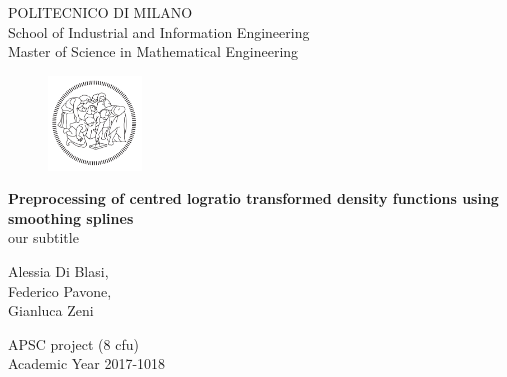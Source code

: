 \thispagestyle{empty}

\vspace*{-1.5cm} \bfseries{
\begin{center}
  \large
  POLITECNICO DI MILANO\\
  \normalsize
  School of Industrial and Information Engineering\\
  Master of Science in Mathematical Engineering\\
  \begin{figure}[htbp]
    \begin{center}
      \includegraphics[width=2.5cm]{./pictures/logopoli.png}
    \end{center}
  \end{figure}
  \vspace*{1.5cm} \LARGE



  \textbf{Preprocessing of centred logratio transformed density functions using smoothing splines}\\



  \vspace*{.75truecm} \Large
  our subtitle \\
  
  \vspace*{3.75truecm} \large
  
    Alessia Di Blasi,\\
    Federico Pavone,\\
    Gianluca Zeni
  
  
  \vspace*{2.75cm} \large

  APSC project (8 cfu) \\

  \vspace*{1.0truecm} \large
  Academic Year 2017-1018
  
\end{center} 
}
